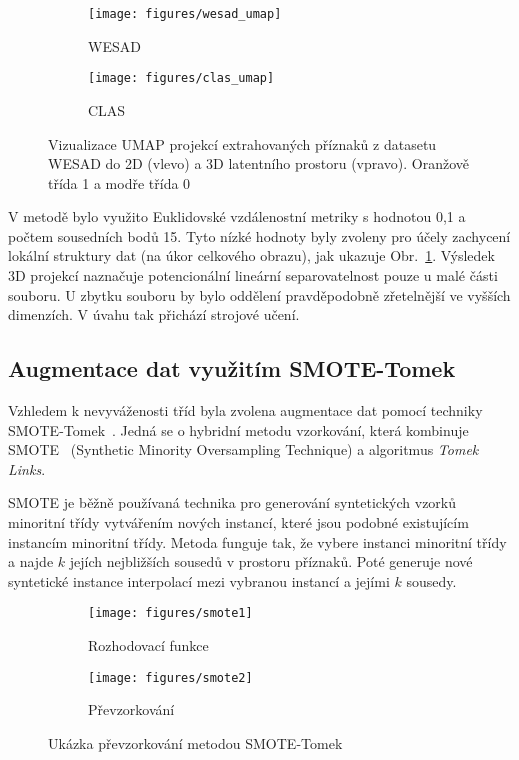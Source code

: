 \begin{figure}[!htb]
    \begin{subfigure}[h]{0.48\linewidth}
        \texttt{[image: figures/wesad\_umap]}
        \caption{WESAD}
    \end{subfigure}
    \hfill
    \begin{subfigure}[h]{0.48\linewidth}
        \texttt{[image: figures/clas\_umap]}
        \caption{CLAS}
    \end{subfigure}
    \caption{Vizualizace UMAP projekcí extrahovaných příznaků z datasetu WESAD
        do 2D (vlevo) a 3D latentního prostoru (vpravo). Oranžově třída 1 a modře
        třída 0}
    \label{fig:umap}
\end{figure}

V metodě bylo využito Euklidovské vzdálenostní metriky s hodnotou 0,1 a počtem
sousedních bodů 15. Tyto nízké hodnoty byly zvoleny pro účely zachycení lokální
struktury dat (na úkor celkového obrazu), jak ukazuje Obr.~\ref{fig:umap}.
Výsledek 3D projekcí naznačuje potencionální lineární separovatelnost pouze u
malé části souboru. U zbytku souboru by bylo oddělení pravděpodobně zřetelnější
ve vyšších dimenzích. V úvahu tak přichází strojové učení.

\subsection{Augmentace dat využitím SMOTE-Tomek}
\label{subsec:augmentace_dat}
Vzhledem k nevyváženosti tříd byla zvolena augmentace dat pomocí techniky
SMOTE-Tomek~\cite{tomek}. Jedná se o hybridní metodu vzorkování, která kombinuje
\gls{SMOTE}~\cite{smote} (Synthetic Minority Oversampling Technique) a
algoritmus \textit{Tomek Links}. 

\gls{SMOTE} je běžně používaná technika pro generování syntetických vzorků
minoritní třídy vytvářením nových instancí, které jsou podobné existujícím
instancím minoritní třídy. Metoda funguje tak, že vybere instanci minoritní
třídy a najde $k$ jejích nejbližších sousedů v prostoru příznaků. Poté generuje
nové syntetické instance interpolací mezi vybranou instancí a jejími $k$
sousedy.

\begin{figure}[!htb]
    \centering
    \begin{subfigure}[h]{0.4\linewidth}
        \texttt{[image: figures/smote1]}
        \caption{Rozhodovací funkce}
    \end{subfigure}
    \hspace{0.7cm}
    \begin{subfigure}[h]{0.4\linewidth}
        \texttt{[image: figures/smote2]}
        \caption{Převzorkování}
    \end{subfigure}
    \caption{Ukázka převzorkování metodou SMOTE-Tomek}
    \label{fig:smote}
\end{figure}

